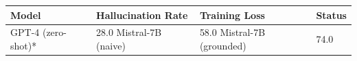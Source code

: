 \begin{tabular}{llll}
\toprule
Model & Hallucination Rate & Training Loss & Status \\
\midrule
GPT-4 (zero-shot)* & 28.0%
Mistral-7B (naive) & 58.0%
Mistral-7B (grounded) & 74.0%
\bottomrule
\end{tabular}
